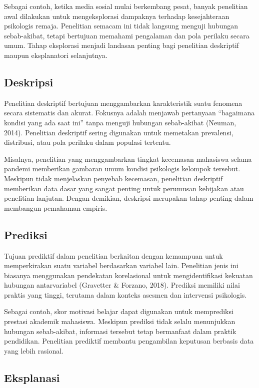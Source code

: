 \documentclass[
  indonesian,
  letterpaper,
  DIV=11,
  numbers=noendperiod]{scrreprt}
\begin{document}
Sebagai contoh, ketika media sosial mulai berkembang pesat, banyak
penelitian awal dilakukan untuk mengeksplorasi dampaknya terhadap
kesejahteraan psikologis remaja. Penelitian semacam ini tidak langsung
menguji hubungan sebab-akibat, tetapi bertujuan memahami pengalaman dan
pola perilaku secara umum. Tahap eksplorasi menjadi landasan penting
bagi penelitian deskriptif maupun eksplanatori selanjutnya.

\subsection{Deskripsi}\label{deskripsi}

Penelitian deskriptif bertujuan menggambarkan karakteristik suatu
fenomena secara sistematis dan akurat. Fokusnya adalah menjawab
pertanyaan ``bagaimana kondisi yang ada saat ini'' tanpa menguji
hubungan sebab-akibat (Neuman, 2014). Penelitian deskriptif sering
digunakan untuk memetakan prevalensi, distribusi, atau pola perilaku
dalam populasi tertentu.

Misalnya, penelitian yang menggambarkan tingkat kecemasan mahasiswa
selama pandemi memberikan gambaran umum kondisi psikologis kelompok
tersebut. Meskipun tidak menjelaskan penyebab kecemasan, penelitian
deskriptif memberikan data dasar yang sangat penting untuk perumusan
kebijakan atau penelitian lanjutan. Dengan demikian, deskripsi merupakan
tahap penting dalam membangun pemahaman empiris.

\subsection{Prediksi}\label{prediksi}

Tujuan prediktif dalam penelitian berkaitan dengan kemampuan untuk
memperkirakan suatu variabel berdasarkan variabel lain. Penelitian jenis
ini biasanya menggunakan pendekatan korelasional untuk mengidentifikasi
kekuatan hubungan antarvariabel (Gravetter \& Forzano, 2018). Prediksi
memiliki nilai praktis yang tinggi, terutama dalam konteks asesmen dan
intervensi psikologis.

Sebagai contoh, skor motivasi belajar dapat digunakan untuk memprediksi
prestasi akademik mahasiswa. Meskipun prediksi tidak selalu menunjukkan
hubungan sebab-akibat, informasi tersebut tetap bermanfaat dalam praktik
pendidikan. Penelitian prediktif membantu pengambilan keputusan berbasis
data yang lebih rasional.

\subsection{Eksplanasi}\label{eksplanasi}
\end{document}
